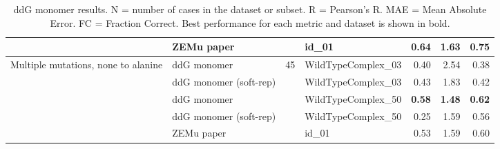 \begin{table}
\begin{tabular}{llrlrrr}
 & ZEMu paper & & id\_01 & \textbf{0.64} & 1.63 & 0.75  \\
\hline
 \multirow{ 5}{*}{Multiple mutations, none to alanine} & ddG monomer & \multirow{ 5}{*}{45} & WildTypeComplex\_03 & 0.40 & 2.54 & 0.38  \\
 & ddG monomer (soft-rep) & & WildTypeComplex\_03 & 0.43 & 1.83 & 0.42  \\
 & ddG monomer & & WildTypeComplex\_50 & \textbf{0.58} & \textbf{1.48} & \textbf{0.62}  \\
 & ddG monomer (soft-rep) & & WildTypeComplex\_50 & 0.25 & 1.59 & 0.56  \\
 & ZEMu paper & & id\_01 & 0.53 & 1.59 & 0.60  \\
\bottomrule
\end{tabular}
  \caption[ddG monomer results]{
    ddG monomer results. N = number of cases in the dataset or subset. R = Pearson's R. MAE = Mean Absolute Error. FC = Fraction Correct. Best performance for each metric and dataset is shown in bold.
  } \label{tab:table-ddG-monomer}
\end{table}
